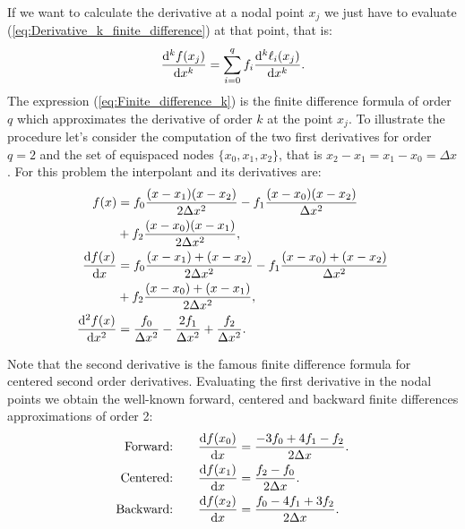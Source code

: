     If we want to calculate the derivative at a nodal point $x_j$ we just have to evaluate (\ref{eq:Derivative_k_finite_difference}) at that point, that is:
    \begin{align}
    \dv[k]{f(x_j)}{x}= \sum_{i=0}^{q} f_i\dv[k]{\ell_i(x_j)}{x}.
    \label{eq:Finite_difference_k}
    \end{align}
    The expression (\ref{eq:Finite_difference_k}) is the finite difference formula of order $q$ which approximates the derivative of order $k$ at the point $x_j$. To illustrate the procedure let's consider the computation of the two first derivatives for order $q=2$ and the set of equispaced nodes $\{x_0,x_1,x_2\}$, that is $x_2-x_1=x_1-x_0=\Delta x$. For this problem the interpolant and its derivatives are:
    \begin{align*}
    	f(x)
    	&
    	=
    	f_0 
    	\frac{(x-x_1)(x-x_2)}{2\Delta x^2}
    	-
    	f_1 
    	\frac{(x-x_0)(x-x_2)}{ \Delta x^2}
    	\\
    	&
    	+
    	f_2 
    	\frac{(x-x_0)(x-x_1)}{2\Delta x^2},
    	\\
    	\dv{f(x)}{x}
    	&
    	=
    	f_0 
    	\frac{(x-x_1)+(x-x_2)}{2\Delta x^2}
    	-
    	f_1 
    	\frac{(x-x_0)+(x-x_2)}{ \Delta x^2}
    	\\
    	&
    	+
    	f_2 
    	\frac{(x-x_0)+(x-x_1)}{2\Delta x^2},
    	\\
    	\dv[2]{f(x)}{x}
    	&
    	=
    	\frac{f_0}{\Delta x^2}
    	-
    	\frac{2f_1}{\Delta x^2}
    	+
    	\frac{f_2}{\Delta x^2}.
    \end{align*}
    
    Note that the second derivative is the famous finite difference formula for centered second order derivatives. Evaluating the first derivative in the nodal points we obtain the well-known forward, centered and backward finite differences approximations of order 2:
    \begin{align*}
          \mbox{Forward:}
          \qquad
          &
          \dv{f(x_0)}{x}
          =
          \frac{-3f_0 + 4f_1 - f_2}{2\Delta x}.
          \\
          \mbox{Centered:}
          \qquad
          &
          \dv{f(x_1)}{x}
          =
          \frac{f_2-f_0}{2\Delta x}.
          \\
          \mbox{Backward:}
          \qquad
          &
          \dv{f(x_2)}{x}
          =
          \frac{ f_0 - 4f_1 + 3f_2 }{2\Delta x}.
    \end{align*}
    
